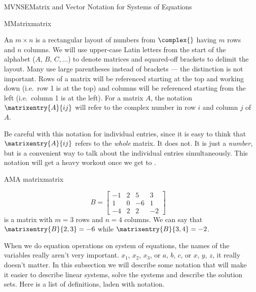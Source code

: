 \begin{subsect}{MVNSE}{Matrix and Vector Notation for Systems of Equations}
%
\begin{definition}{M}{Matrix}{matrix}
\begin{para}An $m\times n$  is a rectangular layout of numbers from $\complex{\null}$ having $m$ rows and $n$ columns.  We will use upper-case Latin letters from the start of the alphabet ($A,\,B,\,C,\dotsc$) to denote matrices and squared-off brackets to delimit the layout.  Many use large parentheses instead of brackets --- the distinction is not important.  Rows of a matrix will be referenced starting at the top and working down (i.e.\ row 1 is at the top) and columns will be referenced starting from the left (i.e.\ column 1 is at the left).  For a matrix $A$, the notation $\matrixentry{A}{ij}$ will refer to the complex number in row $i$ and column $j$ of $A$.\end{para}
\end{definition}
%
\begin{para}Be careful with this notation for individual entries, since it is easy to think that $\matrixentry{A}{ij}$ refers to the {\em whole} matrix.  It does not.  It is just a {\em number}, but is a convenient way to talk about the individual entries simultaneously.  This notation will get a heavy workout once we get to .\end{para}
%
\begin{example}{AM}{A matrix}{matrix}
%
\begin{para}\begin{equation*}
B=\begin{bmatrix}
-1&2&5&3\\
1&0&-6&1\\
-4&2&2&-2
\end{bmatrix}
\end{equation*}
%
is a matrix with $m=3$ rows and $n=4$ columns.  We can say that $\matrixentry{B}{2,3}=-6$ while $\matrixentry{B}{3,4}=-2$.\end{para}
%
\end{example}
%
%
\begin{para}When we do equation operations on system of equations, the names of the variables really aren't very important.  $x_1$, $x_2$, $x_3$, or $a$, $b$, $c$, or $x$, $y$, $z$, it really doesn't matter.  In this subsection we will describe some notation that will make it easier to describe linear systems, solve the systems and describe the solution sets.  Here is a list of definitions, laden with notation.\end{para}

\end{subsect}
